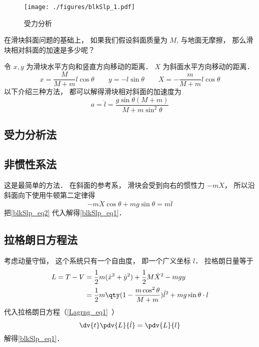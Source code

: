 
\begin{issues}
\issueTODO
\end{issues}


\begin{figure}[ht]
\centering
\texttt{[image: ./figures/blkSlp\_1.pdf]}
\caption{受力分析} \label{blkSlp_fig1}
\end{figure}

在滑块斜面问题的基础上， 如果我们假设斜面质量为 $M$, 与地面无摩擦， 那么滑块相对斜面的加速是多少呢？

令 $x, y$ 为滑块水平方向和竖直方向移动的距离． $X$ 为斜面水平方向移动的距离．
\begin{equation}\label{blkSlp_eq2}
x = \frac{M}{M + m}l\cos\theta
\qquad
y = -l\sin\theta
\qquad
X = -\frac{m}{M + m}l\cos\theta
\end{equation}
以下介绍三种方法， 都可以解得滑块相对斜面的加速度为
\begin{equation}\label{blkSlp_eq1}
a = \ddot l = \frac{g\sin\theta(M+m)}{M + m\sin^2\theta}
\end{equation}

\subsection{受力分析法}

\subsection{非惯性系法}
这是最简单的方法． 在斜面的参考系， 滑块会受到向右的惯性力 $-m\ddot X$， 所以沿斜面向下使用牛顿第二定律得
\begin{equation}
-m\ddot X\cos\theta + mg\sin\theta = m\ddot l
\end{equation}
把\autoref{blkSlp_eq2} 代入解得\autoref{blkSlp_eq1}．

\subsection{拉格朗日方程法}
考虑动量守恒， 这个系统只有一个自由度， 即一个广义坐标 $l$． 拉格朗日量等于
\begin{equation}
\begin{aligned}
L = T - V &= \frac12 m(\dot x^2 + \dot y^2) + \frac12 M \dot X^2 - mgy\\
&= \frac{1}{2}m \qty(1 - \frac{m\cos^2\theta}{M + m}) \dot l^2 + mg\sin\theta \cdot l
\end{aligned}
\end{equation}
代入拉格朗日方程（\autoref{Lagrng_eq1}~）
\begin{equation}
\dv{t} \pdv{L}{\dot l} = \pdv{L}{l}
\end{equation}
解得\autoref{blkSlp_eq1}．
